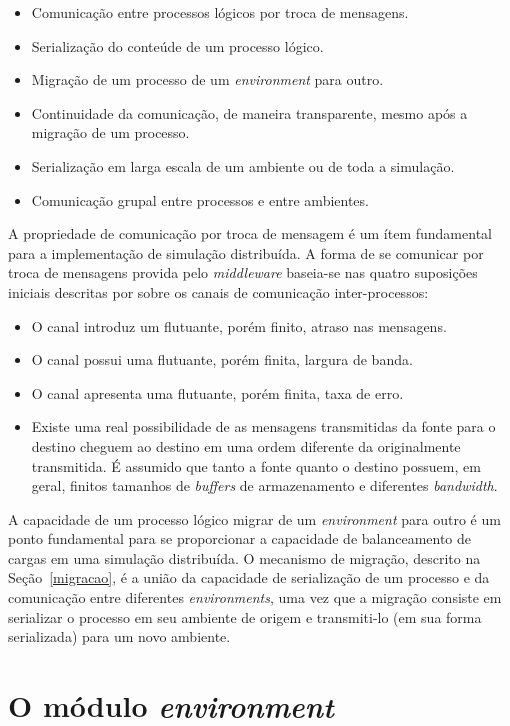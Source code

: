 \begin{itemize}
\item Comunicação entre processos lógicos por troca de mensagens.
\item Serialização do conteúde de um processo lógico.
\item Migração de um processo de um \textit{environment} para outro.
\item Continuidade da comunicação, de maneira transparente, mesmo após a migração de um processo.
\item Serialização em larga escala de um ambiente ou de toda a simulação.
\item Comunicação grupal entre processos e entre ambientes.
\end{itemize}

A propriedade de comunicação por troca de mensagem é um ítem fundamental para a implementação de simulação distribuída. A forma de se comunicar por troca de mensagens provida pelo \textit{middleware} baseia-se nas quatro suposições iniciais descritas por \cite{MCQUILLAN75} sobre os canais de comunicação inter-processos:

\begin{itemize}
\item O canal introduz um flutuante, porém finito, atraso nas mensagens.
\item O canal possui uma flutuante, porém finita, largura de banda.
\item O canal apresenta uma flutuante, porém finita, taxa de erro.
\item Existe uma real possibilidade de as mensagens transmitidas da fonte para o destino cheguem ao destino em uma ordem diferente da originalmente transmitida. É assumido que tanto a fonte quanto o destino possuem, em geral, finitos tamanhos de \textit{buffers} de armazenamento e diferentes \textit{bandwidth}.
\end{itemize}

A capacidade de um processo lógico migrar de um \textit{environment} para outro é um ponto fundamental para se proporcionar a capacidade de balanceamento de cargas em uma simulação distribuída. O mecanismo de migração, descrito na Seção~\ref{migracao}, é a união da capacidade de serialização de um processo e da comunicação entre diferentes \textit{environments}, uma vez que a migração consiste em serializar o processo em seu ambiente de origem e transmiti-lo (em sua forma serializada) para um novo ambiente.

\section{O módulo \textit{environment}}


